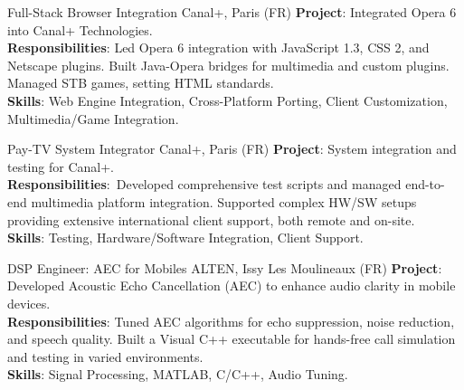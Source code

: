 \documentclass[
  a4paper,
   maincolor=cvblue,
   sectioncolor=cvblue,
]{fortysecondscv}
\begin{document}
\begin{cvtable}
    {Full-Stack Browser Integration}
    {Canal+, Paris (FR)}
    {
      \textbf{Project}: Integrated Opera 6 into Canal+ Technologies.\\
      \textbf{Responsibilities}:
          Led Opera 6 integration with JavaScript 1.3, CSS 2, and Netscape plugins. Built Java-Opera bridges for multimedia and custom plugins. Managed STB games, setting HTML standards.\\
      \textbf{Skills}: Web Engine Integration, Cross-Platform Porting, Client Customization, Multimedia/Game Integration.\\
    }

    {Pay-TV System Integrator}
    {Canal+,  Paris (FR)}
    {
      \textbf{Project}: System integration and testing for Canal+.\\
      \textbf{Responsibilities}:\
          Developed comprehensive test scripts and managed end-to-end multimedia platform integration.
          Supported complex HW/SW setups providing extensive international client support, both remote and on-site.\\
      \textbf{Skills}: Testing, Hardware/Software Integration, Client Support.\\
    }

    {DSP Engineer: AEC for Mobiles}
    {ALTEN, Issy Les Moulineaux (FR)}
    {
      \textbf{Project}: Developed Acoustic Echo Cancellation (AEC) to enhance audio clarity in mobile devices.\\
      \textbf{Responsibilities}:
          Tuned AEC algorithms for echo suppression, noise reduction, and speech quality. Built a Visual C++ executable for hands-free call simulation and testing in varied environments.\\
      \textbf{Skills}: Signal Processing, MATLAB, C/C++, Audio Tuning.
    }
\end{cvtable}
\end{document}
